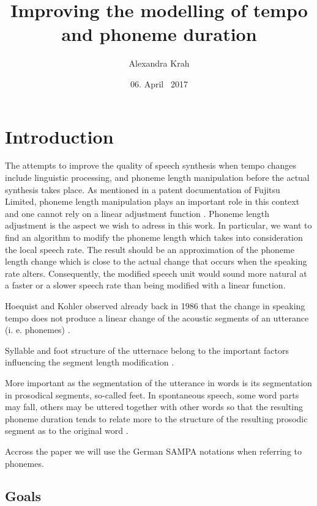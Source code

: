 \documentclass[a4paper]{scrreprt}
\begin{document}
\title{Improving the modelling of tempo and phoneme duration}
\author{Alexandra Krah}
\date{06. April ~2017}
\maketitle
\chapter*{}
\tableofcontents
\listoffigures

\chapter{Introduction}
The attempts to improve the quality of speech synthesis when tempo changes include linguistic processing, and phoneme length manipulation before the actual synthesis takes place. As mentioned in a patent documentation of Fujitsu Limited, phoneme length manipulation plays an important role in this context and one cannot rely on a linear adjustment function \cite{nishiike2008}. Phoneme length adjustment is the aspect we wish to adress in this work. In particular, we want to find an algorithm to modify the phoneme length which takes into consideration the local speech rate. The result should be an approximation of the phoneme length change which is close to the actual change that occurs when the speaking rate alters. Consequently, the modified speech unit would sound more natural at a faster or a slower speech rate than being modified with a linear function.

Hoequist and Kohler observed already back in 1986 that the change in speaking tempo does not produce a linear change of the acoustic segments of an utterance (i. e. phonemes) \cite{Hoequist1986}. 

Syllable and foot structure of the utternace belong to the important factors influencing the segment length modification  \cite{Hoequist1986}.

More important as the segmentation of the utterance in words is its segmentation in prosodical segments, so-called feet. In spontaneous speech, some word parts may fall, others may be uttered together with other words so that the resulting phoneme duration tends to relate more to the structure of the resulting prosodic segment as to the original word \cite{Kohler1986}. 

Accross the paper we will use the German SAMPA notations when referring to phonemes.
\section{Goals}
\end{document}
